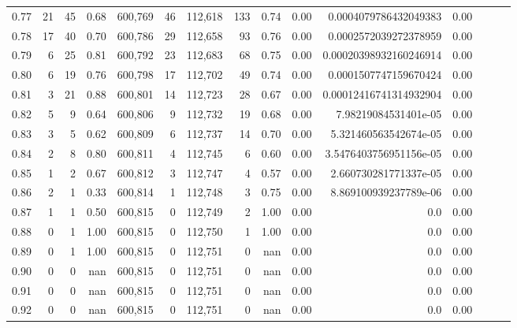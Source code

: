 \begin{tabular}{rrrrrrrrrrrrrrr}
0.77 &      21 &     45 &  0.68 &  600,769 &       46 &  112,618 &      133 &  0.74 &  0.00 &   0.0004079786432049383 &      0.00 \\
0.78 &      17 &     40 &  0.70 &  600,786 &       29 &  112,658 &       93 &  0.76 &  0.00 &   0.0002572039272378959 &      0.00 \\
0.79 &       6 &     25 &  0.81 &  600,792 &       23 &  112,683 &       68 &  0.75 &  0.00 &  0.00020398932160246914 &      0.00 \\
0.80 &       6 &     19 &  0.76 &  600,798 &       17 &  112,702 &       49 &  0.74 &  0.00 &   0.0001507747159670424 &      0.00 \\
0.81 &       3 &     21 &  0.88 &  600,801 &       14 &  112,723 &       28 &  0.67 &  0.00 &  0.00012416741314932904 &      0.00 \\
0.82 &       5 &      9 &  0.64 &  600,806 &        9 &  112,732 &       19 &  0.68 &  0.00 &    7.98219084531401e-05 &      0.00 \\
0.83 &       3 &      5 &  0.62 &  600,809 &        6 &  112,737 &       14 &  0.70 &  0.00 &   5.321460563542674e-05 &      0.00 \\
0.84 &       2 &      8 &  0.80 &  600,811 &        4 &  112,745 &        6 &  0.60 &  0.00 &  3.5476403756951156e-05 &      0.00 \\
0.85 &       1 &      2 &  0.67 &  600,812 &        3 &  112,747 &        4 &  0.57 &  0.00 &   2.660730281771337e-05 &      0.00 \\
0.86 &       2 &      1 &  0.33 &  600,814 &        1 &  112,748 &        3 &  0.75 &  0.00 &   8.869100939237789e-06 &      0.00 \\
0.87 &       1 &      1 &  0.50 &  600,815 &        0 &  112,749 &        2 &  1.00 &  0.00 &                     0.0 &      0.00 \\
0.88 &       0 &      1 &  1.00 &  600,815 &        0 &  112,750 &        1 &  1.00 &  0.00 &                     0.0 &      0.00 \\
0.89 &       0 &      1 &  1.00 &  600,815 &        0 &  112,751 &        0 &   nan &  0.00 &                     0.0 &      0.00 \\
0.90 &       0 &      0 &   nan &  600,815 &        0 &  112,751 &        0 &   nan &  0.00 &                     0.0 &      0.00 \\
0.91 &       0 &      0 &   nan &  600,815 &        0 &  112,751 &        0 &   nan &  0.00 &                     0.0 &      0.00 \\
0.92 &       0 &      0 &   nan &  600,815 &        0 &  112,751 &        0 &   nan &  0.00 &                     0.0 &      0.00 \\

\end{tabular}
